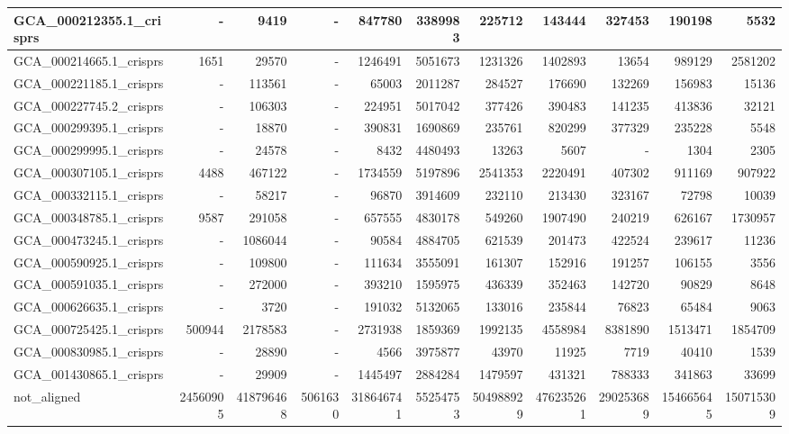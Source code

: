 \documentclass[12pt,a4paper]{article}
\begin{document}
\begin{table}[ht]
\begin{center}
\begin{tabular}{|l*{10}{|r}|}
GCA\_000212355.1\_crisprs & - & 9419 & - & 847780 & 3389983 & 225712 & 143444 & 327453 & 190198 & 5532 \\ \hline
GCA\_000214665.1\_crisprs & 1651 & 29570 & - & 1246491 & 5051673 & 1231326 & 1402893 & 13654 & 989129 & 2581202 \\ \hline
GCA\_000221185.1\_crisprs & - & 113561 & - & 65003 & 2011287 & 284527 & 176690 & 132269 & 156983 & 15136 \\ \hline
GCA\_000227745.2\_crisprs & - & 106303 & - & 224951 & 5017042 & 377426 & 390483 & 141235 & 413836 & 32121 \\ \hline
GCA\_000299395.1\_crisprs & - & 18870 & - & 390831 & 1690869 & 235761 & 820299 & 377329 & 235228 & 5548 \\ \hline
GCA\_000299995.1\_crisprs & - & 24578 & - & 8432 & 4480493 & 13263 & 5607 & - & 1304 & 2305 \\ \hline
GCA\_000307105.1\_crisprs & 4488 & 467122 & - & 1734559 & 5197896 & 2541353 & 2220491 & 407302 & 911169 & 907922 \\ \hline
GCA\_000332115.1\_crisprs & - & 58217 & - & 96870 & 3914609 & 232110 & 213430 & 323167 & 72798 & 10039 \\ \hline
GCA\_000348785.1\_crisprs & 9587 & 291058 & - & 657555 & 4830178 & 549260 & 1907490 & 240219 & 626167 & 1730957 \\ \hline
GCA\_000473245.1\_crisprs & - & 1086044 & - & 90584 & 4884705 & 621539 & 201473 & 422524 & 239617 & 11236 \\ \hline
GCA\_000590925.1\_crisprs & - & 109800 & - & 111634 & 3555091 & 161307 & 152916 & 191257 & 106155 & 3556 \\ \hline
GCA\_000591035.1\_crisprs & - & 272000 & - & 393210 & 1595975 & 436339 & 352463 & 142720 & 90829 & 8648 \\ \hline
GCA\_000626635.1\_crisprs & - & 3720 & - & 191032 & 5132065 & 133016 & 235844 & 76823 & 65484 & 9063 \\ \hline
GCA\_000725425.1\_crisprs & 500944 & 2178583 & - & 2731938 & 1859369 & 1992135 & 4558984 & 8381890 & 1513471 & 1854709 \\ \hline
GCA\_000830985.1\_crisprs & - & 28890 & - & 4566 & 3975877 & 43970 & 11925 & 7719 & 40410 & 1539 \\ \hline
GCA\_001430865.1\_crisprs & - & 29909 & - & 1445497 & 2884284 & 1479597 & 431321 & 788333 & 341863 & 33699 \\ \hline
not\_aligned & 24560905 & 418796468 & 5061630 & 318646741 & 55254753 & 504988929 & 476235261 & 290253689 & 154665645 & 150715309 \\ \hline
\end{tabular}
\end{center}
\end{table}
\end{document}
